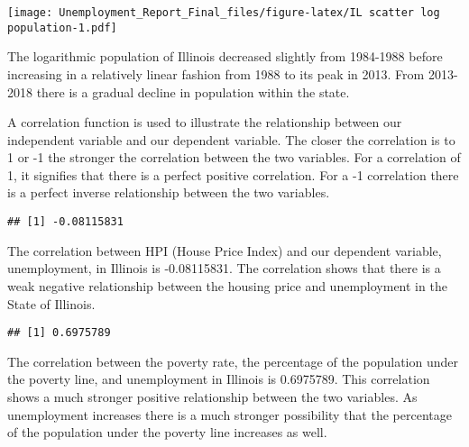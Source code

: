 \documentclass[
]{article}
\newenvironment{Shaded}{\begin{snugshade}}{\end{snugshade}}
\newcommand{\KeywordTok}[1]{\textcolor[rgb]{0.13,0.29,0.53}{\textbf{#1}}}
\newcommand{\NormalTok}[1]{#1}
\newcommand{\OperatorTok}[1]{\textcolor[rgb]{0.81,0.36,0.00}{\textbf{#1}}}
\begin{document}
\texttt{[image: Unemployment\_Report\_Final\_files/figure-latex/IL scatter log population-1.pdf]}

The logarithmic population of Illinois decreased slightly from 1984-1988
before increasing in a relatively linear fashion from 1988 to its peak
in 2013. From 2013-2018 there is a gradual decline in population within
the state.

A correlation function is used to illustrate the relationship between
our independent variable and our dependent variable. The closer the
correlation is to 1 or -1 the stronger the correlation between the two
variables. For a correlation of 1, it signifies that there is a perfect
positive correlation. For a -1 correlation there is a perfect inverse
relationship between the two variables.

\begin{Shaded}
\end{Shaded}

\begin{verbatim}
## [1] -0.08115831
\end{verbatim}

The correlation between HPI (House Price Index) and our dependent
variable, unemployment, in Illinois is -0.08115831. The correlation
shows that there is a weak negative relationship between the housing
price and unemployment in the State of Illinois.

\begin{Shaded}
\end{Shaded}

\begin{verbatim}
## [1] 0.6975789
\end{verbatim}

The correlation between the poverty rate, the percentage of the
population under the poverty line, and unemployment in Illinois is
0.6975789. This correlation shows a much stronger positive relationship
between the two variables. As unemployment increases there is a much
stronger possibility that the percentage of the population under the
poverty line increases as well.
\end{document}
